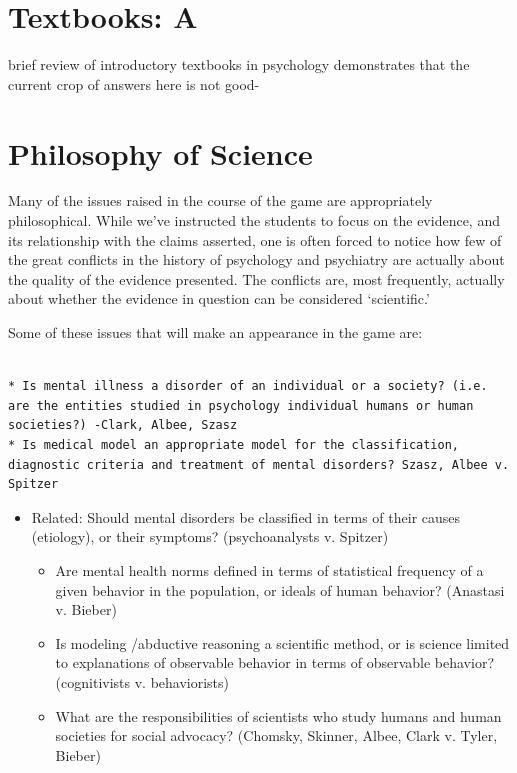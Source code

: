 \section{Textbooks: A}
\label{textbooks:a}

brief review of introductory textbooks in psychology demonstrates that the current crop of answers here is not good-

\section{Philosophy of Science}
\label{philosophyofscience}

Many of the issues raised in the course of the game are appropriately philosophical. While we've instructed the students to focus on the evidence, and its relationship with the claims asserted, one is often forced to notice how few of the great conflicts in the history of psychology and psychiatry are actually about the quality of the evidence presented. The conflicts are, most frequently, actually about whether the evidence in question can be considered `scientific.' 

Some of these issues that will make an appearance in the game are:

\begin{adjustwidth}{2.5em}{2.5em}
\begin{verbatim}

* Is mental illness a disorder of an individual or a society? (i.e. are the entities studied in psychology individual humans or human societies?) -Clark, Albee, Szasz
* Is medical model an appropriate model for the classification, diagnostic criteria and treatment of mental disorders? Szasz, Albee v. Spitzer

\end{verbatim}
\end{adjustwidth}

\begin{itemize}
\item Related: Should mental disorders be classified in terms of their causes (etiology), or their symptoms? (psychoanalysts v. Spitzer)

\begin{itemize}
\item Are mental health norms defined in terms of statistical frequency of a given behavior in the population, or ideals of human behavior? (Anastasi v. Bieber)

\item Is modeling \slash  abductive reasoning a scientific method, or is science limited to explanations of observable behavior in terms of observable behavior? (cognitivists v. behaviorists)

\item What are the responsibilities of scientists who study humans and human societies for social advocacy? (Chomsky, Skinner, Albee, Clark v. Tyler, Bieber)

\end{itemize}

\end{itemize}

